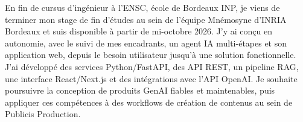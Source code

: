 
\begin{cvparagraph}
En fin de cursus d’ingénieur à l’ENSC, école de Bordeaux INP, je viens de terminer mon stage de fin d’études au sein de l’équipe Mnémosyne d’INRIA Bordeaux et suis disponible à partir de mi-octobre 2026. J’y ai conçu en autonomie, avec le suivi de mes encadrants, un agent IA multi-étapes et son application web, depuis le besoin utilisateur jusqu’à une solution fonctionnelle. J’ai développé des services Python/FastAPI, des API REST, un pipeline RAG, une interface React/Next.js et des intégrations avec l’API OpenAI. Je souhaite poursuivre la conception de produits GenAI fiables et maintenables, puis appliquer ces compétences à des workflows de création de contenus au sein de Publicis Production.
\end{cvparagraph}
